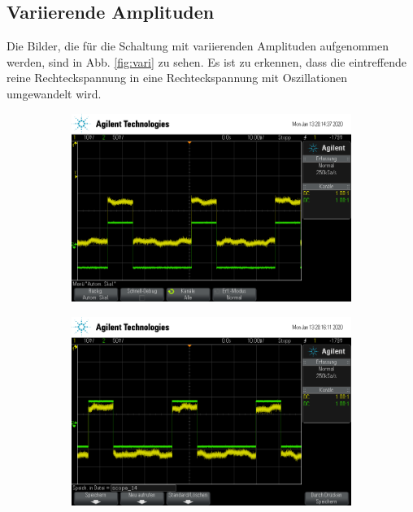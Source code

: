             

        \subsection{Variierende Amplituden}

            Die Bilder, die für die Schaltung mit variierenden Amplituden aufgenommen werden, 
            sind in Abb. \ref{fig:vari} zu sehen. Es ist zu erkennen, dass die eintreffende 
            reine Rechteckspannung in eine Rechteckspannung mit Oszillationen umgewandelt wird. 
            

            \begin{figure}[H]
                \centering
                \begin{subfigure}{0.48\textwidth}
                        \centering
                        \includegraphics[width=\textwidth]{scope_13.png}%
                        \label{fig:TU}
                    \end{subfigure}
                    \begin{subfigure}{0.48\textwidth}
                        \centering
                        \includegraphics[width=\textwidth]{scope_14.png}%

\end{subfigure}
\end{figure}
